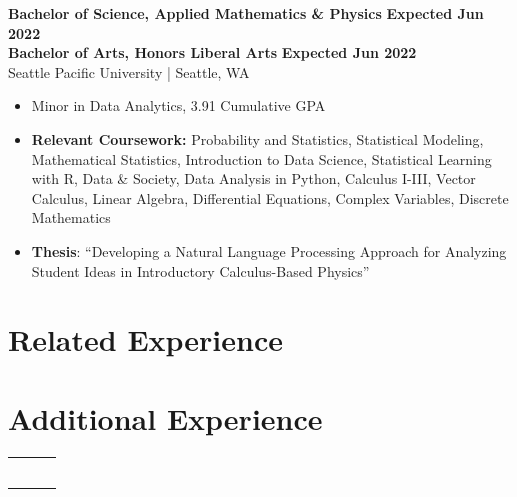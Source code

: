\documentclass{article}
\begin{document}
    \textbf{Bachelor of Science, Applied Mathematics \& Physics} \hfill \textbf{Expected Jun 2022}\\
    \textbf{Bachelor of Arts, Honors Liberal Arts} \hfill \textbf{Expected Jun 2022}\\
    Seattle Pacific University | Seattle, WA 
    \squish
    \begin{itemize} \setlength\itemsep{-2pt}
        \item Minor in Data Analytics, 3.91 Cumulative GPA
        \item 
        \textbf{Relevant Coursework:} Probability and Statistics, Statistical Modeling, Mathematical Statistics, Introduction to Data Science, Statistical Learning with R, Data \& Society, Data Analysis in Python, Calculus I-III, Vector Calculus, Linear Algebra, Differential Equations, Complex Variables, Discrete Mathematics
        \item \textbf{Thesis}: ``Developing a Natural Language Processing Approach for Analyzing Student Ideas in Introductory Calculus-Based Physics'' %
    \end{itemize}


\section{Related Experience}

    
    
    
        


\section{Additional Experience}

    \begin{flushleft}
        \begin{tabularx}{\textwidth}{l l R}
                      \\
                         \\
              \\
                    \\
                             \\
                     \\
        \end{tabularx}
    \end{flushleft}
\end{document}
